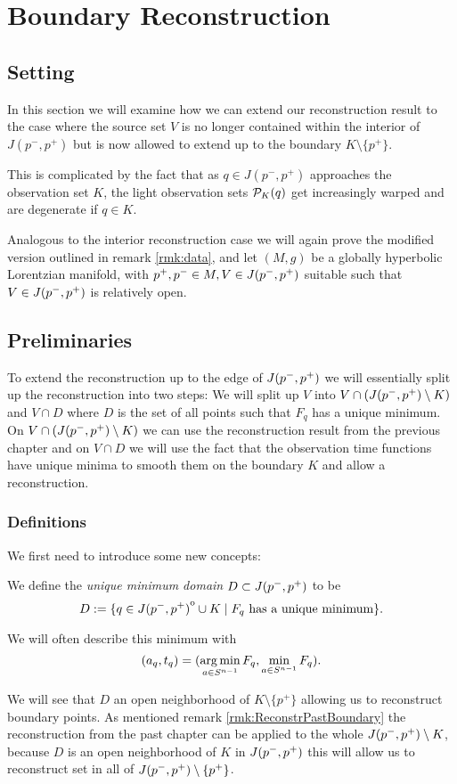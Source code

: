 \chapter{Boundary Reconstruction}\label{chap:boundary}

\section{Setting}

In this section we will examine how we can extend our reconstruction result to the case where the source set $V$ is no longer contained within the interior of $J(p^-,p^+)$ but is now allowed to extend up to the boundary $K \setminus \{p^+\}$. 

This is complicated by the fact that as $q\in J(p^-,p^+)$ approaches the observation set $K$, the light observation sets ${\mathcal{P}}_K(q)$ get increasingly warped and are degenerate if $q\in K$. 

Analogous to the interior reconstruction case we will again prove the modified version outlined in remark \ref{rmk:data}, and let $(M,g)$ be a globally hyperbolic Lorentzian manifold, with $p^+,p^-\in M,V\in J(p^-,p^+)$ suitable such that $V\in J(p^-,p^+)$ is relatively open.

\section{Preliminaries}
To extend the reconstruction up to the edge of $J(p^-,p^+)$ we will essentially split up the reconstruction into two steps: We will split up $V$ into $V\cap (J(p^-,p^+) \setminus K)$ and $V\cap D$ where $D$ is the set of all points such that $F_q$ has a unique minimum. On $V\cap (J(p^-,p^+) \setminus K)$ we can use the reconstruction result from the previous chapter and on $V\cap D$ we will use the fact that the observation time functions have unique minima to smooth them on the boundary $K$ and allow a reconstruction.

\subsection{Definitions}
We first need to introduce some new concepts:
\begin{definition}\label{def:uniquemindomain}
    We define the \emph{unique minimum domain} $D\subset J(p^-,p^+)$ to be 
    \begin{equation}
        D:=\{q\in {\kern0ptJ(p^-,p^+)}^{\mathrm{o}} \cup K \mid F_q\text{ has a unique minimum}\}.
    \end{equation}

    We will often describe this minimum with 
    \[
        (a_q,t_q)=(\operatorname*{arg\,min}_{a\in {S^{n-1}}} F_q, \min_{a\in {S^{n-1}}} F_q).
    \]
\end{definition}
We will see that $D$ an open neighborhood of $K \setminus \{p^+\}$ allowing us to reconstruct boundary points. As mentioned remark \ref{rmk:ReconstrPastBoundary} the reconstruction from the past chapter can be applied to the whole $J(p^-,p^+)\setminus K$, because $D$ is an open neighborhood of $K$ in $J(p^-,p^+)$ this will allow us to reconstruct set in all of $J(p^-,p^+)\setminus \{p^+\}$.

